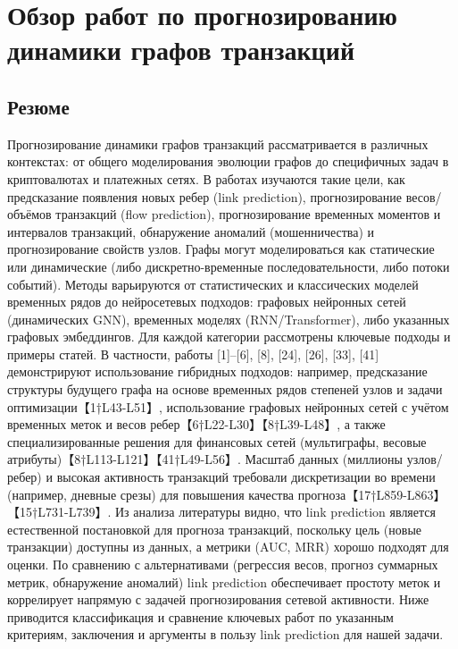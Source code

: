 \section{Обзор работ по прогнозированию динамики графов транзакций}

\subsection*{Резюме} 
Прогнозирование динамики графов транзакций рассматривается в различных контекстах: от общего моделирования эволюции графов до специфичных задач в криптовалютах и платежных сетях. В работах изучаются такие цели, как предсказание появления новых ребер (link prediction), прогнозирование весов/объёмов транзакций (flow prediction), прогнозирование временных моментов и интервалов транзакций, обнаружение аномалий (мошенничества) и прогнозирование свойств узлов. Графы могут моделироваться как статические или динамические (либо дискретно-временные последовательности, либо потоки событий). Методы варьируются от статистических и классических моделей временных рядов до нейросетевых подходов: графовых нейронных сетей (динамических GNN), временных моделях (RNN/Transformer), либо указанных графовых эмбеддингов. Для каждой категории рассмотрены ключевые подходы и примеры статей. В частности, работы [1]–[6], [8], [24], [26], [33], [41] демонстрируют использование гибридных подходов: например, предсказание структуры будущего графа на основе временных рядов степеней узлов и задачи оптимизации【1†L43-L51】, использование графовых нейронных сетей с учётом временных меток и весов ребер【6†L22-L30】【8†L39-L48】, а также специализированные решения для финансовых сетей (мультиграфы, весовые атрибуты)【8†L113-L121】【41†L49-L56】. Масштаб данных (миллионы узлов/ребер) и высокая активность транзакций требовали дискретизации во времени (например, дневные срезы) для повышения качества прогноза【17†L859-L863】【15†L731-L739】. Из анализа литературы видно, что link prediction является естественной постановкой для прогноза транзакций, поскольку цель (новые транзакции) доступны из данных, а метрики (AUC, MRR) хорошо подходят для оценки. По сравнению с альтернативами (регрессия весов, прогноз суммарных метрик, обнаружение аномалий) link prediction обеспечивает простоту меток и коррелирует напрямую с задачей прогнозирования сетевой активности. Ниже приводится классификация и сравнение ключевых работ по указанным критериям, заключения и аргументы в пользу link prediction для нашей задачи.

